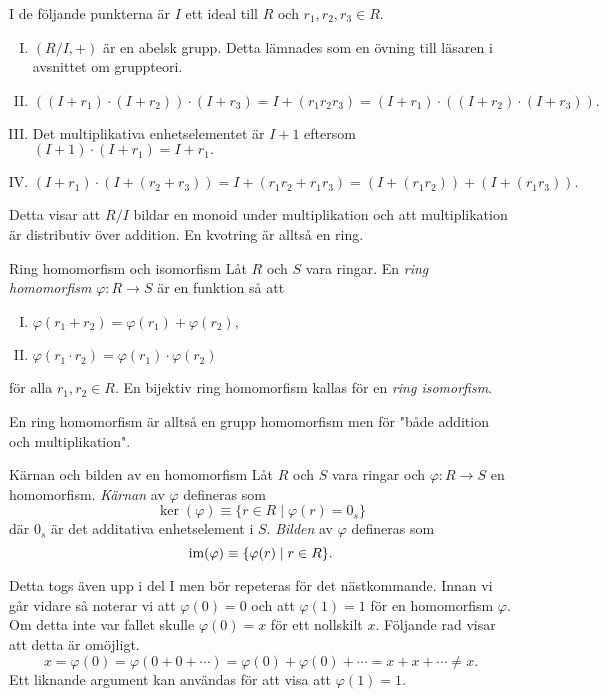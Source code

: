 \documentclass{article}
\newcommand{\im}[0]{\textnormal{im}}
\theoremstyle{definition}
\begin{document}
I de följande punkterna är $I$ ett ideal till $R$ och $r_1, r_2, r_3 \in R$. 
\begin{enumerate}[I)]
  \item $(R/I, +)$ är en abelsk grupp. Detta lämnades som en övning till läsaren i avsnittet om gruppteori.
  \item $((I + r_1) \cdot (I + r_2)) \cdot (I + r_3) = I + (r_1 r_2 r_3) = (I + r_1) \cdot ((I + r_2) \cdot (I + r_3)).$
  \item Det multiplikativa enhetselementet är $I + 1$ eftersom $(I + 1) \cdot (I + r_1) = I + r_1.$
  \item $(I + r_1) \cdot (I + (r_2 + r_3)) = I + (r_1r_2 + r_1r_3) = (I + (r_1r_2)) + (I + (r_1r_3)).$
\end{enumerate}
Detta visar att $R/I$ bildar en monoid under multiplikation och att multiplikation är distributiv över addition. En kvotring är alltså en ring.

\begin{mydef}{Ring homomorfism och isomorfism}{}
  Låt $R$ och $S$ vara ringar. En \textit{ring homomorfism} $\varphi: R \rightarrow S$ är en funktion så att 
  \begin{enumerate}[I)]
    \item $\varphi(r_1 + r_2) = \varphi(r_1) + \varphi(r_2)$,
    \item $\varphi(r_1 \cdot r_2) = \varphi(r_1) \cdot \varphi(r_2)$
  \end{enumerate}
  för alla $r_1, r_2 \in R$. En bijektiv ring homomorfism kallas för en \textit{ring isomorfism}.
\end{mydef}
En ring homomorfism är alltså en grupp homomorfism men för "både addition och multiplikation".

\begin{mydef}{Kärnan och bilden av en homomorfism}{}
  Låt $R$ och $S$ vara ringar och $\varphi: R \rightarrow S$ en homomorfism. \textit{Kärnan} av $\varphi$
  defineras som 
  \[\ker(\varphi) \equiv \{r \in R \; | \; \varphi(r) = 0_s\}\]
  där $0_s$ är det additativa enhetselement i $S$.
  \textit{Bilden} av $\varphi$ defineras som 
  \[\im(\varphi) \equiv \{\varphi(r) \; | \; r \in R\}.\]
\end{mydef}
Detta togs även upp i del I men bör repeteras för det nästkommande. Innan vi går vidare 
så noterar vi att $\varphi(0) = 0$ och att $\varphi(1) = 1$ för en homomorfism $\varphi$. Om detta inte var fallet skulle $\varphi(0) = x$ för ett nollskilt $x$. 
Följande rad visar att detta är omöjligt.
\[x = \varphi(0) = \varphi(0 + 0 + \cdots) = \varphi(0) + \varphi(0) + \cdots =  x + x + \cdots \neq x.\]
Ett liknande argument kan användas för att visa att $\varphi(1) = 1$.
\end{document}
